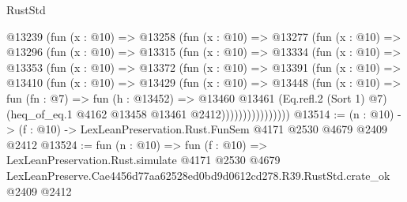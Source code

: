 \begin{lexlean}{RustStd}
\begin{coremodule}
        @13239
          (fun (x : @10) =>
          @13258
            (fun (x : @10) =>
            @13277
              (fun (x : @10) =>
              @13296
                (fun (x : @10) =>
                @13315
                  (fun (x : @10) =>
                  @13334
                    (fun (x : @10) =>
                    @13353
                      (fun (x : @10) =>
                      @13372
                        (fun (x : @10) =>
                        @13391
                          (fun (x : @10) =>
                          @13410
                            (fun (x : @10) =>
                            @13429
                              (fun (x : @10) =>
                              @13448
                                (fun (x : @10) =>
                                fun (fn : @7) =>
                                fun (h : @13452) =>
                                @13460
                                  @13461
                                  (Eq.refl.{2} (Sort 1) @7)
                                  (heq_of_eq.{1} @4162 @13458 @13461 @2412))))))))))))))))
@13514 := (n : @10) -> (f : @10) -> LexLeanPreservation.Rust.FunSem @4171 @2530 @4679 @2409 @2412
@13524 := fun (n : @10) =>
  fun (f : @10) =>
  LexLeanPreservation.Rust.simulate
    @4171
    @2530
    @4679
    LexLeanPreserve.Cae4456d77aa62528ed0bd9d0612cd278.R39.RustStd.crate_ok
    @2409
    @2412
\end{coremodule}
\end{lexlean}
